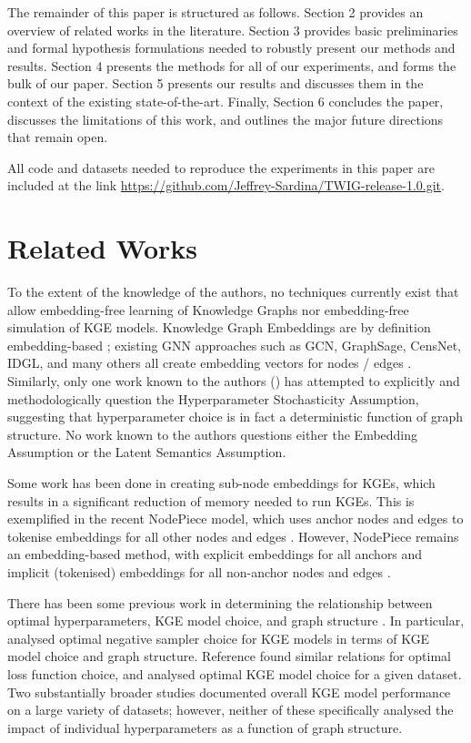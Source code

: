 The remainder of this paper is structured as follows. Section 2 provides an overview of related works in the literature. Section 3 provides basic preliminaries and formal hypothesis formulations needed to robustly present our methods and results. Section 4 presents the methods for all of our experiments, and forms the bulk of our paper. Section 5 presents our results and discusses them in the context of the existing state-of-the-art. Finally, Section 6 concludes the paper, discusses the limitations of this work, and outlines the major future directions that remain open.

All code and datasets needed to reproduce the experiments in this paper are included at the link \url{https://github.com/Jeffrey-Sardina/TWIG-release-1.0.git}.

\section{Related Works}
To the extent of the knowledge of the authors, no techniques currently exist that allow embedding-free learning of Knowledge Graphs nor embedding-free simulation of KGE models. Knowledge Graph Embeddings are by definition embedding-based \cite{rml-review,kge-survey,kge-completion-rev,kg-ovewview}; existing GNN approaches such as GCN, GraphSage, CensNet, IDGL, and many others all create embedding vectors for nodes / edges \cite{censnet,idgl,gnn-overview}. Similarly, only one work known to the authors (\cite{hp-struct-basis}) has attempted to explicitly and methodologically question the Hyperparameter Stochasticity Assumption, suggesting that hyperparameter choice is in fact a deterministic function of graph structure. No work known to the authors questions either the Embedding Assumption or the Latent Semantics Assumption.

Some work has been done in creating sub-node embeddings for KGEs, which results in a significant reduction of memory needed to run KGEs. This is exemplified in the recent NodePiece model, which uses anchor nodes and edges to tokenise embeddings for all other nodes and edges \cite{nodepiece}. However, NodePiece remains an embedding-based method, with explicit embeddings for all anchors and implicit (tokenised) embeddings for all non-anchor nodes and edges \cite{nodepiece}.

There has been some previous work in determining the relationship between optimal hyperparameters, KGE model choice, and graph structure \cite{light-into-the-dark,old-dog-new-tricks,neg-samp-analysis,loss-func-analysis,kges-for-lp-compare}. In particular, \cite{neg-samp-analysis} analysed optimal negative sampler choice for KGE models in terms of KGE model choice and graph structure. Reference \cite{loss-func-analysis} found similar relations for optimal loss function choice, and \cite{kges-for-lp-compare} analysed optimal KGE model choice for a given dataset. Two substantially broader studies \cite{light-into-the-dark,old-dog-new-tricks} documented overall KGE model performance on a large variety of datasets; however, neither of these specifically analysed the impact of individual hyperparameters as a function of graph structure.

